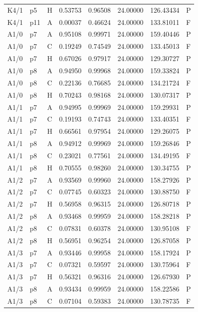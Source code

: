 \begin{longtable}{llllllll}
K4/1 & p5 & H & 0.53753 & 0.96508 & 24.00000 & 126.43434 & P \\
K4/1 & p11 & A & 0.00037 & 0.46624 & 24.00000 & 133.81011 & F \\
A1/0 & p7 & A & 0.95108 & 0.99971 & 24.00000 & 159.40446 & P \\
A1/0 & p7 & C & 0.19249 & 0.74549 & 24.00000 & 133.45013 & F \\
A1/0 & p7 & H & 0.67026 & 0.97917 & 24.00000 & 129.30727 & P \\
A1/0 & p8 & A & 0.94950 & 0.99968 & 24.00000 & 159.33824 & P \\
A1/0 & p8 & C & 0.22136 & 0.76685 & 24.00000 & 134.21724 & F \\
A1/0 & p8 & H & 0.70243 & 0.98168 & 24.00000 & 130.07317 & P \\
A1/1 & p7 & A & 0.94995 & 0.99969 & 24.00000 & 159.29931 & P \\
A1/1 & p7 & C & 0.19193 & 0.74743 & 24.00000 & 133.40351 & F \\
A1/1 & p7 & H & 0.66561 & 0.97954 & 24.00000 & 129.26075 & P \\
A1/1 & p8 & A & 0.94912 & 0.99969 & 24.00000 & 159.26846 & P \\
A1/1 & p8 & C & 0.23021 & 0.77561 & 24.00000 & 134.49195 & F \\
A1/1 & p8 & H & 0.70555 & 0.98260 & 24.00000 & 130.34755 & P \\
A1/2 & p7 & A & 0.93569 & 0.99960 & 24.00000 & 158.27926 & P \\
A1/2 & p7 & C & 0.07745 & 0.60323 & 24.00000 & 130.88750 & F \\
A1/2 & p7 & H & 0.56958 & 0.96315 & 24.00000 & 126.80718 & P \\
A1/2 & p8 & A & 0.93468 & 0.99959 & 24.00000 & 158.28218 & P \\
A1/2 & p8 & C & 0.07831 & 0.60378 & 24.00000 & 130.95108 & F \\
A1/2 & p8 & H & 0.56951 & 0.96254 & 24.00000 & 126.87058 & P \\
A1/3 & p7 & A & 0.93446 & 0.99958 & 24.00000 & 158.17924 & P \\
A1/3 & p7 & C & 0.07321 & 0.59597 & 24.00000 & 130.75964 & F \\
A1/3 & p7 & H & 0.56321 & 0.96316 & 24.00000 & 126.67930 & P \\
A1/3 & p8 & A & 0.93434 & 0.99959 & 24.00000 & 158.22586 & P \\
A1/3 & p8 & C & 0.07104 & 0.59383 & 24.00000 & 130.78735 & F \\

\end{longtable}
